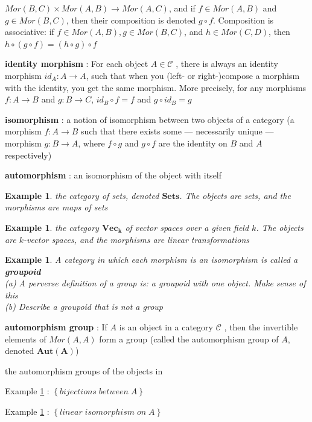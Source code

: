 \documentclass{article}
\newtheorem{example}[theorem]{Example}
\begin{document}
$Mor(B, C)\times Mor(A, B)\rightarrow Mor(A, C)$, and if $f \in Mor(A, B)$ and $g \in Mor(B, C)$, then their composition is denoted $g \circ f$. Composition is associative: if $f \in Mor(A, B), g \in Mor(B, C)$, and $h \in Mor(C, D)$, then $h \circ (g \circ f) = (h \circ g) \circ f$

\textbf{identity morphism} : For each object $A \in \mathscr C$ , there is always an identity morphism $id_A : A \rightarrow A$, such that when you (left- or right-)compose a morphism with the identity, you get the same morphism. More precisely, for any morphisms $f : A \rightarrow B$ and $g: B \rightarrow C$, $id_B \circ f = f$ and $g \circ id_B = g$

\textbf{isomorphism} : a notion of isomorphism between two objects of a category (a morphism $f : A \rightarrow B$ such that there exists some — necessarily unique — morphism $g: B \rightarrow A$, where $f \circ g$ and $g \circ f$ are the identity on $B$ and $A$ respectively)

\textbf{automorphism} : an isomorphism of the object with itself
\begin{example}
the category of sets, denoted $\boldsymbol{Sets}$. The objects are sets, and the morphisms are maps of sets
\label{1.1}
\end{example}
\begin{example}
the category $\boldsymbol{Vec_k}$ of vector spaces over a given field $k$. The objects are $k$-vector spaces, and the morphisms are linear transformations
\label{1.2}
\end{example}
\begin{example}
A category in which each morphism is an isomorphism is called a \textbf{groupoid}\\
(a) A perverse definition of a group is: a groupoid with one object. Make sense of this\\
(b) Describe a groupoid that is not a group
\end{example}
\textbf{automorphism group} : If $A$ is an object in a category $\mathscr C$ , then the invertible elements of $Mor(A, A)$ form a group (called the automorphism group of $A$, denoted $\boldsymbol{Aut(A)}$)

the automorphism groups of the objects in 

Example \ref{1.1} : $\left\{bijections\; between\; A\right\}$  

Example \ref{1.2} : $\left\{linear\; isomorphism\; on\; A\right\}$
\end{document}
